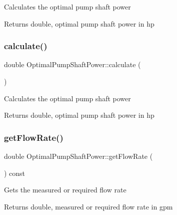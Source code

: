 Calculates the optimal pump shaft power

\begin{DoxyReturn}{Returns}
double, optimal pump shaft power in hp 
\end{DoxyReturn}
\mbox{\label{class_optimal_pump_shaft_power_a23ab040eea0a9e0431988bd353076237}} 
\subsubsection{\texorpdfstring{calculate()}{calculate()}\hspace{0.1cm}{\footnotesize\ttfamily [3/3]}}
{\footnotesize\ttfamily double Optimal\+Pump\+Shaft\+Power\+::calculate (\begin{DoxyParamCaption}{ }\end{DoxyParamCaption})}

Calculates the optimal pump shaft power

\begin{DoxyReturn}{Returns}
double, optimal pump shaft power in hp 
\end{DoxyReturn}
\mbox{\label{class_optimal_pump_shaft_power_a8c1532459a196347f7d5219d4690a490}} 
\subsubsection{\texorpdfstring{get\+Flow\+Rate()}{getFlowRate()}\hspace{0.1cm}{\footnotesize\ttfamily [1/3]}}
{\footnotesize\ttfamily double Optimal\+Pump\+Shaft\+Power\+::get\+Flow\+Rate (\begin{DoxyParamCaption}{ }\end{DoxyParamCaption}) const\hspace{0.3cm}{\ttfamily [inline]}}

Gets the measured or required flow rate

\begin{DoxyReturn}{Returns}
double, measured or required flow rate in gpm 
\end{DoxyReturn}


